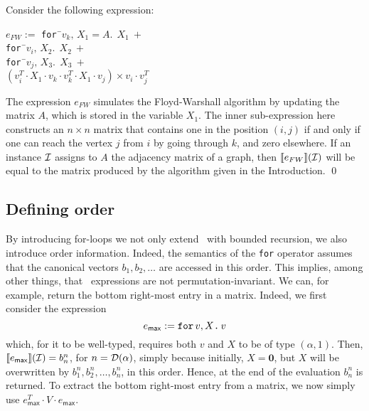 \begin{example}\label{ex:floyd}
Consider the following expression:
\begin{center}
\parbox{0cm}{
\begin{tabbing}
$e_{FW} := $ \texttt{for\,}\=$v_k,\, X_1\!=\!A.\ \ X_1 \ + $\\
\> \texttt{for\,}\=$v_i, \, X_2.\ \ X_2 \ +$ \\
\>\>\texttt{for\,}\=$v_j,\, X_3.\ \ X_3 \ +$ \\
\>\>\>$(v_i^T\cdot X_1\cdot v_k \cdot v_k^T\cdot X_1\cdot v_j)\times v_i\cdot v_j^T$
\end{tabbing}
}
\end{center}
The expression $e_{FW}$ simulates the Floyd-Warshall algorithm by updating the matrix $A$, which is stored in the variable $X_1$. The inner sub-expression here constructs an $n\times n$ matrix that contains one in the position $(i,j)$ if and only if one can reach the vertex $j$ from $i$ by going through $k$, and zero elsewhere. If an instance $\mathcal{I}$ assigns to $A$ the adjacency matrix of a graph, then $\llbracket e_{FW} \rrbracket(\mathcal{I})$ will be equal to the matrix produced by the algorithm given in the Introduction.
\qed
\end{example}

\subsection{Defining order}
\label{sec:formatlang:design}

By introducing for-loops we not only extend \lang\ with bounded recursion, we also introduce order information. Indeed,
the semantics of the \texttt{for} operator assumes that the canonical vectors $b_1,b_2,\ldots$
are accessed in this order. This implies, among other things, that \langfor\ expressions are not permutation-invariant.
We can, for example, return the bottom right-most entry in a matrix. Indeed, we first consider the expression 
$$
e_{\mathsf{max}} := \texttt{for}\, v,X \texttt{.}\, v
$$
which, for it to be well-typed, requires both $v$ and $X$ to be of type $(\alpha,1)$. Then, $\llbracket e_{\mathsf{max}} \rrbracket(\mathcal{I})=b_n^n$, for $n=\mathcal{D}(\alpha)$, simply because initially, $X=\mathbf{0}$, but $X$ will be overwritten by $b_1^n,b_2^n,\ldots,b_n^n$, in this order. Hence, at the end of the evaluation $b_n^n$ is returned.
To extract the bottom right-most entry from a matrix, we now simply use $e_{\mathsf{max}}^T\cdot V\cdot e_{\mathsf{max}}$.



